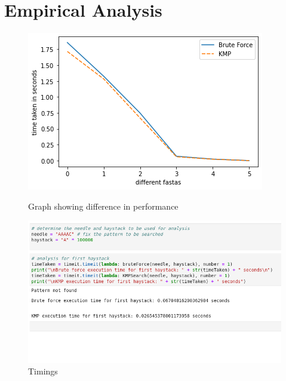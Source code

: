 \section*{Empirical Analysis}

\begin{figure}[H]
  \centering
  \begin{minipage}[b]{0.49\textwidth}
    \includegraphics[width=\textwidth]{images/graph.png}
    \caption{Graph showing difference in performance}
    \label{fig:graph}
  \end{minipage}
  \hfill
  \begin{minipage}[b]{0.49\textwidth}
    \includegraphics[width=\textwidth]{images/worst_case.png}
    \caption{Timings}
    \label{fig:timings}
  \end{minipage}
\end{figure}


